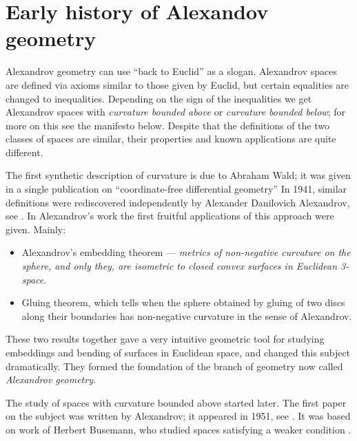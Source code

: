 \section*{Early history of Alexandov geometry}

Alexandrov geometry can use ``back to Euclid'' as a slogan.
Alexandrov spaces are defined via axioms similar to those given by Euclid,
but certain  equalities are changed to inequalities. 
Depending on the sign of the inequalities we get Alexandrov spaces with \emph{curvature bounded above} or \emph{curvature bounded below};
for more on this see the manifesto below.
Despite that the definitions of the two classes of spaces are similar, their properties and known applications are quite different.

The first synthetic description of curvature is due to Abraham Wald; 
it was given in a single publication  on ``coordinate-free differential geometry''
In 1941, similar definitions were rediscovered independently by 
Alexander Danilovich Alexandrov,
see \cite{alexandrov:def}.
In Alexandrov's work the first fruitful applications of this approach were given.
Mainly:
\begin{itemize}
\item Alexandrov's embedding theorem  --- 
\textit{metrics of non-negative curvature on the sphere, and only they, are isometric to closed convex surfaces in Euclidean 3-space}. 
\item Gluing theorem, which tells  when the sphere obtained by gluing of two discs along their boundaries has non-negative curvature in the sense of Alexandrov.
\end{itemize}
These two results together gave  a very intuitive geometric tool for studying  embeddings and bending of surfaces in  Euclidean space, and changed this subject dramatically.
They formed the foundation of the branch of geometry now called \emph{Alexandrov geometry}.

The study of  spaces with curvature bounded above started later.
The first paper on the subject was written by Alexandrov; it appeared in 1951, see \cite{alexandrov:strong-angle}.
It was based on work of Herbert Busemann, who studied spaces satisfying a weaker condition \cite{busemann-CBA}.

